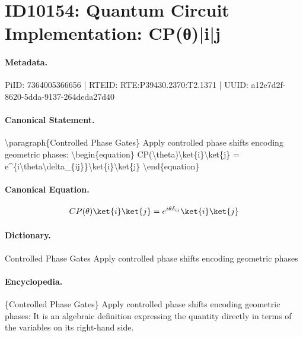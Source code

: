 \section*{ID10154: Quantum Circuit Implementation: CP(θ)|i|j}
\paragraph{Metadata.}
PiID: 7364005366656 | RTEID: RTE:P39430.2370:T2.1371 | UUID: a12e7d2f-8620-5dda-9137-264deda27d40

\paragraph{Canonical Statement.}
\textbackslash{}paragraph\{Controlled Phase Gates\} Apply controlled phase shifts encoding geometric phases: \textbackslash{}begin\{equation\} CP(\textbackslash{}theta)\textbackslash{}ket\{i\}\textbackslash{}ket\{j\} = e\textasciicircum{}\{i\textbackslash{}theta\textbackslash{}delta\_\{ij\}\}\textbackslash{}ket\{i\}\textbackslash{}ket\{j\} \textbackslash{}end\{equation\}

\paragraph{Canonical Equation.}
\[
CP(\theta)\ket{i}\ket{j} = e^{i\theta\delta_{ij}}\ket{i}\ket{j}
\]

\paragraph{Dictionary.}
Controlled Phase Gates Apply controlled phase shifts encoding geometric phases

\paragraph{Encyclopedia.}
\{Controlled Phase Gates\} Apply controlled phase shifts encoding geometric phases: It is an algebraic definition expressing the quantity directly in terms of the variables on its right-hand side.

